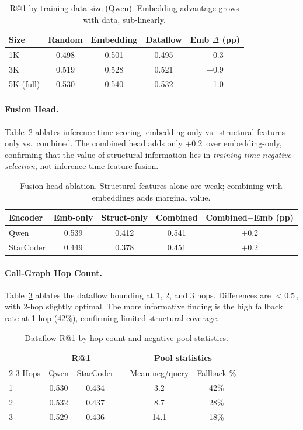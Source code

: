 \documentclass[11pt]{article}
\newcommand{\pp}{\,\text{pp}}
\begin{document}
\begin{table}[t]
\centering
\caption{R@1 by training data size (Qwen). Embedding advantage grows with data, sub-linearly.}
\label{tab:datasize}
\begin{tabular}{lcccc}
\toprule
Size & Random & Embedding & Dataflow & Emb $\Delta$ (pp) \\
\midrule
1K       & 0.498 & 0.501 & 0.495 & $+$0.3 \\
3K       & 0.519 & 0.528 & 0.521 & $+$0.9 \\
5K (full)& 0.530 & 0.540 & 0.532 & $+$1.0 \\
\bottomrule
\end{tabular}
\end{table}

\paragraph{Fusion Head.}
Table~\ref{tab:fusion} ablates inference-time scoring: embedding-only vs.\ structural-features-only vs.\ combined.
The combined head adds only $+$0.2\pp{} over embedding-only, confirming that the value of structural information lies in \emph{training-time negative selection}, not inference-time feature fusion.

\begin{table}[t]
\centering
\caption{Fusion head ablation. Structural features alone are weak; combining with embeddings adds marginal value.}
\label{tab:fusion}
\begin{tabular}{lcccc}
\toprule
Encoder & Emb-only & Struct-only & Combined & Combined$-$Emb (pp) \\
\midrule
Qwen     & 0.539 & 0.412 & 0.541 & $+$0.2 \\
StarCoder & 0.449 & 0.378 & 0.451 & $+$0.2 \\
\bottomrule
\end{tabular}
\end{table}

\paragraph{Call-Graph Hop Count.}
Table~\ref{tab:hopcnt} ablates the dataflow bounding at 1, 2, and 3 hops.
Differences are $<$0.5\pp{}, with 2-hop slightly optimal.
The more informative finding is the high fallback rate at 1-hop (42\%), confirming limited structural coverage.

\begin{table}[t]
\centering
\caption{Dataflow R@1 by hop count and negative pool statistics.}
\label{tab:hopcnt}
\begin{tabular}{lcccccc}
\toprule
 & \multicolumn{2}{c}{R@1} & & \multicolumn{2}{c}{Pool statistics} \\
\cmidrule{2-3} \cmidrule{5-6}
Hops & Qwen & StarCoder & & Mean neg/query & Fallback \% \\
\midrule
1 & 0.530 & 0.434 & & 3.2 & 42\% \\
2 & 0.532 & 0.437 & & 8.7 & 28\% \\
3 & 0.529 & 0.436 & & 14.1 & 18\% \\
\bottomrule
\end{tabular}
\end{table}
\end{document}
